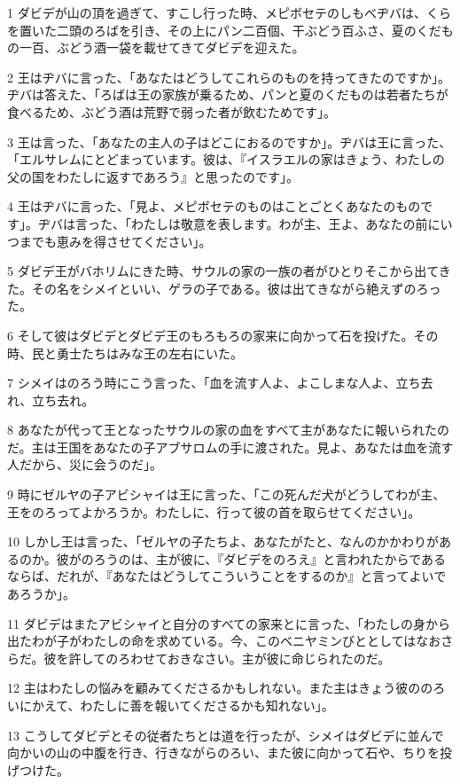 \par 1 ダビデが山の頂を過ぎて、すこし行った時、メピボセテのしもべヂバは、くらを置いた二頭のろばを引き、その上にパン二百個、干ぶどう百ふさ、夏のくだもの一百、ぶどう酒一袋を載せてきてダビデを迎えた。
\par 2 王はヂバに言った、「あなたはどうしてこれらのものを持ってきたのですか」。ヂバは答えた、「ろばは王の家族が乗るため、パンと夏のくだものは若者たちが食べるため、ぶどう酒は荒野で弱った者が飲むためです」。
\par 3 王は言った、「あなたの主人の子はどこにおるのですか」。ヂバは王に言った、「エルサレムにとどまっています。彼は、『イスラエルの家はきょう、わたしの父の国をわたしに返すであろう』と思ったのです」。
\par 4 王はヂバに言った、「見よ、メピボセテのものはことごとくあなたのものです」。ヂバは言った、「わたしは敬意を表します。わが主、王よ、あなたの前にいつまでも恵みを得させてください」。
\par 5 ダビデ王がバホリムにきた時、サウルの家の一族の者がひとりそこから出てきた。その名をシメイといい、ゲラの子である。彼は出てきながら絶えずのろった。
\par 6 そして彼はダビデとダビデ王のもろもろの家来に向かって石を投げた。その時、民と勇士たちはみな王の左右にいた。
\par 7 シメイはのろう時にこう言った、「血を流す人よ、よこしまな人よ、立ち去れ、立ち去れ。
\par 8 あなたが代って王となったサウルの家の血をすべて主があなたに報いられたのだ。主は王国をあなたの子アブサロムの手に渡された。見よ、あなたは血を流す人だから、災に会うのだ」。
\par 9 時にゼルヤの子アビシャイは王に言った、「この死んだ犬がどうしてわが主、王をのろってよかろうか。わたしに、行って彼の首を取らせてください」。
\par 10 しかし王は言った、「ゼルヤの子たちよ、あなたがたと、なんのかかわりがあるのか。彼がのろうのは、主が彼に、『ダビデをのろえ』と言われたからであるならば、だれが、『あなたはどうしてこういうことをするのか』と言ってよいであろうか」。
\par 11 ダビデはまたアビシャイと自分のすべての家来とに言った、「わたしの身から出たわが子がわたしの命を求めている。今、このベニヤミンびととしてはなおさらだ。彼を許してのろわせておきなさい。主が彼に命じられたのだ。
\par 12 主はわたしの悩みを顧みてくださるかもしれない。また主はきょう彼ののろいにかえて、わたしに善を報いてくださるかも知れない」。
\par 13 こうしてダビデとその従者たちとは道を行ったが、シメイはダビデに並んで向かいの山の中腹を行き、行きながらのろい、また彼に向かって石や、ちりを投げつけた。

